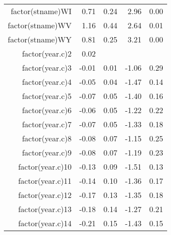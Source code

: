 \begin{table}[ht]
\begin{tabular}{rrrrr}
  factor(stname)WI & 0.71 & 0.24 & 2.96 & 0.00 \\ 
  factor(stname)WV & 1.16 & 0.44 & 2.64 & 0.01 \\ 
  factor(stname)WY & 0.81 & 0.25 & 3.21 & 0.00 \\ 
  factor(year.c)2 & 0.02 &  &  &  \\ 
  factor(year.c)3 & -0.01 & 0.01 & -1.06 & 0.29 \\ 
  factor(year.c)4 & -0.05 & 0.04 & -1.47 & 0.14 \\ 
  factor(year.c)5 & -0.07 & 0.05 & -1.40 & 0.16 \\ 
  factor(year.c)6 & -0.06 & 0.05 & -1.22 & 0.22 \\ 
  factor(year.c)7 & -0.07 & 0.05 & -1.33 & 0.18 \\ 
  factor(year.c)8 & -0.08 & 0.07 & -1.15 & 0.25 \\ 
  factor(year.c)9 & -0.08 & 0.07 & -1.19 & 0.23 \\ 
  factor(year.c)10 & -0.13 & 0.09 & -1.51 & 0.13 \\ 
  factor(year.c)11 & -0.14 & 0.10 & -1.36 & 0.17 \\ 
  factor(year.c)12 & -0.17 & 0.13 & -1.35 & 0.18 \\ 
  factor(year.c)13 & -0.18 & 0.14 & -1.27 & 0.21 \\ 
  factor(year.c)14 & -0.21 & 0.15 & -1.43 & 0.15 \\ 
   \hline
\end{tabular}
\end{table}

